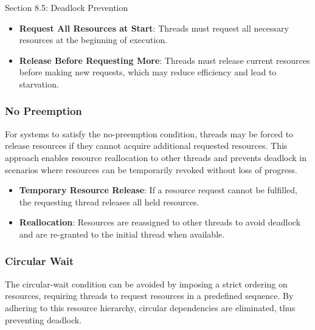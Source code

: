 \begin{notes}{Section 8.5: Deadlock Prevention}
    \begin{highlight}
    
        \begin{itemize}
            \item \textbf{Request All Resources at Start}: Threads must request all necessary resources at the beginning of execution.
            \item \textbf{Release Before Requesting More}: Threads must release current resources before making new requests, which may reduce efficiency and lead to starvation.
        \end{itemize}
    
    \end{highlight}
    
    \subsubsection*{No Preemption}
    
    For systems to satisfy the no-preemption condition, threads may be forced to release resources if they cannot acquire additional requested resources. This approach enables resource reallocation 
    to other threads and prevents deadlock in scenarios where resources can be temporarily revoked without loss of progress.
    
    \begin{highlight}[No Preemption]
    
        \begin{itemize}
            \item \textbf{Temporary Resource Release}: If a resource request cannot be fulfilled, the requesting thread releases all held resources.
            \item \textbf{Reallocation}: Resources are reassigned to other threads to avoid deadlock and are re-granted to the initial thread when available.
        \end{itemize}
    
    \end{highlight}
    
    \subsubsection*{Circular Wait}
    
    The circular-wait condition can be avoided by imposing a strict ordering on resources, requiring threads to request resources in a predefined sequence. By adhering to this resource hierarchy, 
    circular dependencies are eliminated, thus preventing deadlock.
    

\end{notes}
